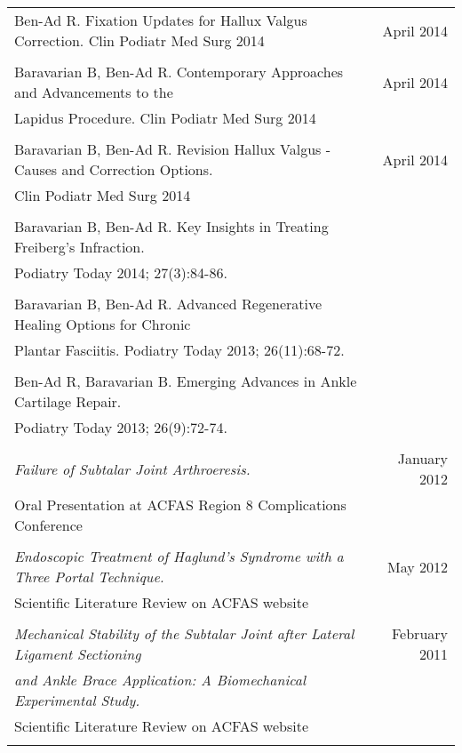 \documentclass[letterpaper,10pt]{article}
\newcommand{\len}{7in}
\begin{document}
\begin{tabular*}{\len}{@{\extracolsep{\fill}}lr}
    \\
    Ben-Ad R. Fixation Updates for Hallux Valgus Correction. Clin Podiatr Med Surg 2014 & April 2014 \\
    \\
    Baravarian B, Ben-Ad R. Contemporary Approaches and Advancements to the & April 2014 \\
    Lapidus Procedure. Clin Podiatr Med Surg 2014 \\
    \\
    Baravarian B, Ben-Ad R. Revision Hallux Valgus - Causes and Correction Options. & April 2014 \\
    Clin Podiatr Med Surg 2014 \\
    \\
    Baravarian B, Ben-Ad R. Key Insights in Treating Freiberg's Infraction. \\
    Podiatry Today 2014; 27(3):84-86. \\
    \\
    Baravarian B, Ben-Ad R. Advanced Regenerative Healing Options for Chronic \\
    Plantar Fasciitis. Podiatry Today 2013; 26(11):68-72. \\
    \\
    Ben-Ad R, Baravarian B. Emerging Advances in Ankle Cartilage Repair. \\
    Podiatry Today 2013; 26(9):72-74. \\
    \\
    \textit{Failure of Subtalar Joint Arthroeresis.} & January 2012 \\
    Oral Presentation at ACFAS Region 8 Complications Conference \\
    \\
    \textit{Endoscopic Treatment of Haglund’s Syndrome with a Three Portal Technique.} & May 2012 \\
    Scientific Literature Review on ACFAS website \\
    \\
    \textit{Mechanical Stability of the Subtalar Joint after Lateral Ligament Sectioning} & February 2011 \\
    \textit{and Ankle Brace Application: A Biomechanical Experimental Study.} \\
    Scientific Literature Review on ACFAS website \\
    \\
\end{tabular*}
\end{document}
